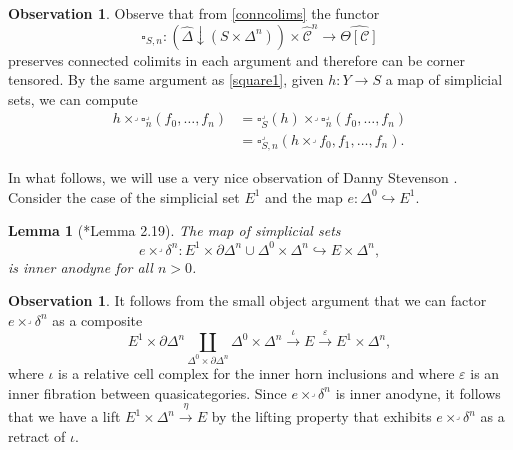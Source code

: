 \documentclass[a4paper]{article}
\numberwithin{equation}{subsection}
\theoremstyle{plain}   %
\newtheorem{lemma}[equation]{Lemma}
\theoremstyle{definition}
\newtheorem{obs}[equation]{Observation}
\theoremstyle{remark}
\theoremstyle{plain}
\newcommand{\overcat}[2]{{\left(#1\downarrow #2\right)}}
\newcommand{\psh}[1]{\ensuremath{\widehat{#1}}}
\providecommand{\C}{}
\renewcommand{\C}{\ensuremath{\mathcal{C}}}
\newcommand{\cellset}{\ensuremath{\widehat{\Theta[\mathcal{C}]}}}
\begin{document}
\begin{obs}\label{joyalsquare1}
	Observe that from \ref{conncolims} the functor 
	\[\square_{S,n}:\overcat{\psh{\Delta}}{(S\times\Delta^n)} \times\psh{\C}^n \to \cellset\]
	preserves connected colimits in each argument and therefore can be corner tensored. By the same argument as \ref{square1}, given \(h:Y\to S\) a map of simplicial sets, we can compute 
	\begin{align*}
		 h \times^\lrcorner \square^\lrcorner_n(f_0,\dots,f_n)  &= \square_S^\lrcorner(h)\times^\lrcorner \square^\lrcorner_n(f_0,\dots,f_n)\\
		&= \square^\lrcorner_{S,n}(h\times^\lrcorner f_0,f_1,\dots,f_n).
	\end{align*}
\end{obs}

In what follows, we will use a very nice observation of Danny Stevenson \cite{danny}.  Consider the case of the simplicial set \(E^1\) and the map \(e:\Delta^0 \hookrightarrow E^1\).  
\begin{lemma}[\cite{danny}*{Lemma 2.19}]\label{dannythm}
	The map of simplicial sets
	\[e\times^\lrcorner \delta^n: E^1\times \partial\Delta^n \cup \Delta^0 \times \Delta^n \hookrightarrow E\times \Delta^n,\]
	is inner anodyne for all \(n>0\).  
\end{lemma}
\begin{obs}\label{retractjoyal}
	It follows from the small object argument that we can factor \(e\times^\lrcorner \delta^n\) as a composite
	\[
	E^1 \times \partial \Delta^n \coprod_{\Delta^0 \times \partial \Delta^n} \Delta^0 \times \Delta^n \xrightarrow{\iota} E \xrightarrow{\varepsilon} E^1 \times \Delta^n,
	\] 
	where \(\iota\) is a relative cell complex for the inner horn inclusions and where \(\varepsilon\) is an inner fibration between quasicategories. Since \(e\times^\lrcorner \delta^n\) is inner anodyne, it follows that we have a lift \(E^1\times \Delta^n \xrightarrow{\eta} E\) by the lifting property that exhibits \(e\times^\lrcorner \delta^n\) as a retract of \(\iota\).  
\end{obs}
\end{document}
